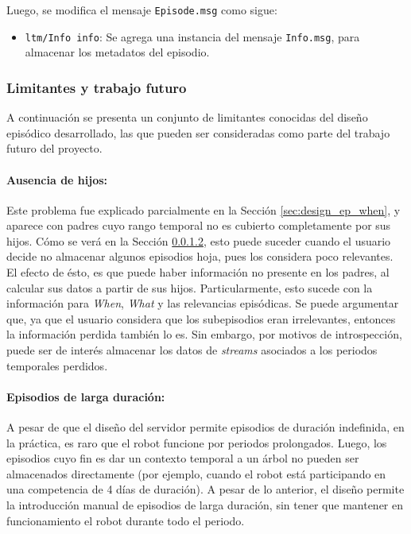 Luego, se modifica el mensaje \texttt{Episode.msg} como sigue:
\begin{itemize}
	\item \texttt{ltm/Info info}: Se agrega una instancia del mensaje \texttt{Info.msg}, para almacenar los metadatos del episodio.
\end{itemize}


\subsubsection{Limitantes y trabajo futuro}


A continuación se presenta un conjunto de limitantes conocidas del diseño episódico desarrollado, las que pueden ser consideradas como parte del trabajo futuro del proyecto.

\paragraph{Ausencia de hijos:} Este problema fue explicado parcialmente en la Sección \ref{sec:design_ep_when}, y aparece con padres cuyo rango temporal no es cubierto completamente por sus hijos. Cómo se verá en la Sección \ref{}, esto puede suceder cuando el usuario decide no almacenar algunos episodios hoja, pues los considera poco relevantes. El efecto de ésto, es que puede haber información no presente en los padres, al calcular sus datos a partir de sus hijos. Particularmente, esto sucede con la información para \textit{When}, \textit{What} y las relevancias episódicas. Se puede argumentar que, ya que el usuario considera que los subepisodios eran irrelevantes, entonces la información perdida también lo es. Sin embargo, por motivos de introspección, puede ser de interés almacenar los datos de \textit{streams} asociados a los periodos temporales perdidos.

\paragraph{Episodios de larga duración:}
A pesar de que el diseño del servidor permite episodios de duración indefinida, en la práctica, es raro que el robot funcione por periodos prolongados. Luego, los episodios cuyo fin es dar un contexto temporal a un árbol no pueden ser almacenados directamente (por ejemplo, cuando el robot está participando en una competencia de 4 días de duración). A pesar de lo anterior, el diseño permite la introducción manual de episodios de larga duración, sin tener que mantener en funcionamiento el robot durante todo el periodo.

